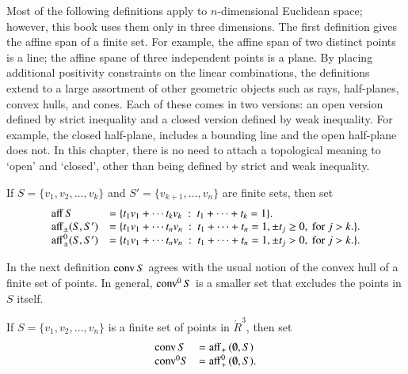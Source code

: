 
Most of the following definitions apply to $n$-dimensional
Euclidean space; however, this book uses them only in
three dimensions.  The first definition 
gives the affine span of a finite set.  For example,
the affine span of two distinct points is a line;
the affine spane of three independent points is a plane.
By placing additional
positivity constraints on the linear combinations, the definitions
extend to a large assortment of other geometric objects
such as rays, half-planes, convex hulls, and cones.  
Each of these comes in two versions: an open version
defined by strict inequality and a closed version defined
by weak inequality.  For example, the closed half-plane,
includes a bounding line and the open half-plane does
not.  In this chapter, there is no need
to attach a topological meaning to `open' and `closed',
other than being defined by strict and weak inequality.


\begin{definition}[affine]\label{def:aff} 
 If $S = \{v_1,v_2,\ldots,v_k\}$ 
and $S'=\{v_{k+1},\ldots,v_n\}$ are  finite sets, then
set
	$$\begin{array}{lll}
      {\operatorname{aff}}\, S &= \{t_1 v_1 +\cdots t_k v_k \ :\ 
	t_1 +\cdots+t_k = 1\}.\\
        {\operatorname{aff}}_{\pm} (S,S') &= \{t_1 v_1 +\cdots t_n v_n \ :\ 
	t_1 +\cdots+t_n = 1, \pm t_j \ge 0, \text{ for } j>k.\}.\\
        {\operatorname{aff}}^0_{\pm} (S,S') &= \{t_1 v_1 +\cdots t_n v_n \ :\ 
	t_1 +\cdots+t_n = 1, \pm t_j > 0, \text{ for } j>k.\}.\\
		\end{array}
        $$
\end{definition}


In the next definition ${\operatorname{conv}}\,S$ agrees with the usual
notion of the convex hull of a finite set of points.
In general, ${\operatorname{conv}}^0\,S$ is a smaller set that excludes
the points in $S$ itself.  


\begin{definition}  If $S = \{v_1,v_2,\ldots,v_n\}$ is a finite set
of points in $\ring{R}^3$, then
set
	$$
        \begin{array}{lll}
          {\operatorname{conv}}\, S &= {\operatorname{aff}}_+\, (\emptyset,S)\\
	   {\operatorname{conv}}^0 S &= {\operatorname{aff}}^0_+\, (\emptyset,S).\\
           \end{array}
        $$
\end{definition}


